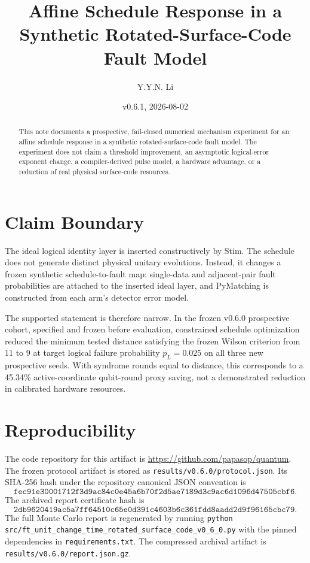 \documentclass[11pt]{article}
\title{Affine Schedule Response in a Synthetic Rotated-Surface-Code Fault Model}
\author{Y.Y.N. Li}
\date{v0.6.1, 2026-08-02}
\begin{document}
\maketitle

\begin{abstract}
This note documents a prospective, fail-closed numerical mechanism experiment
for an affine schedule response in a synthetic rotated-surface-code fault
model. The experiment does not claim a threshold improvement, an asymptotic
logical-error exponent change, a compiler-derived pulse model, a hardware
advantage, or a reduction of real physical surface-code resources.
\end{abstract}

\section{Claim Boundary}
The ideal logical identity layer is inserted constructively by Stim. The
schedule does not generate distinct physical unitary evolutions. Instead, it
changes a frozen synthetic schedule-to-fault map: single-data and adjacent-pair
fault probabilities are attached to the inserted ideal layer, and PyMatching is
constructed from each arm's detector error model.

The supported statement is therefore narrow. In the frozen v0.6.0 prospective
cohort, specified and frozen before evaluation, constrained schedule
optimization reduced the minimum tested distance satisfying the frozen Wilson
criterion from \(11\) to \(9\) at target logical failure probability
\(p_L=0.025\) on all three new prospective seeds. With syndrome rounds equal
to distance, this corresponds to a 45.34\% active-coordinate qubit-round proxy
saving, not a demonstrated reduction in calibrated hardware resources.

\section{Reproducibility}
The code repository for this artifact is
\url{https://github.com/papasop/quantum}. The frozen protocol artifact is
stored as \texttt{results/v0.6.0/protocol.json}. Its SHA-256 hash under the
repository canonical JSON convention is
\[
\texttt{fec91e30001712f3d9ac84c0e45a6b70f2d5ae7189d3c9ac6d1096d47505cbf6}.
\]
The archived report certificate hash is
\[
\texttt{2db9620419ac5a7ff64510c65e0d391c4603b6c361fdd8aadd2d9f96165cbc79}.
\]
The full Monte Carlo report is regenerated by running
\texttt{python src/ft\_unit\_change\_time\_rotated\_surface\_code\_v0\_6\_0.py}
with the pinned dependencies in \texttt{requirements.txt}. The compressed
archival artifact is \texttt{results/v0.6.0/report.json.gz}.
\end{document}
